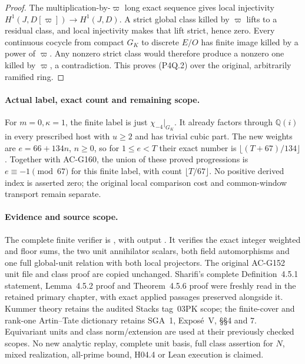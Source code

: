 \begin{proof}
The multiplication-by-$\varpi$ long exact sequence gives
local injectivity $H^1(J,D[\varpi])\to H^1(J,D)$.
A strict global class killed by $\varpi$ lifts to a residual
class, and local injectivity makes that lift strict, hence zero.
Every continuous cocycle from compact $G_K$ to discrete $E/O$
has finite image killed by a power of $\varpi$.
Any nonzero strict class would therefore produce a nonzero
one killed by $\varpi$, a contradiction.
This proves (P4Q.2) over the original, arbitrarily ramified ring.
\end{proof}

\paragraph{Actual label, exact count and remaining scope.}
For $m=0,\kappa=1$, the finite label is just $\chi_{-4}|_{G_K}$.
It already factors through $\mathbb Q(i)$ in every prescribed
host with $u\geq2$ and has trivial cubic part.
The new weights are $e=66+134n$, $n\geq0$, so for $1\leq e<T$
their exact number is $\lfloor(T+67)/134\rfloor$.
Together with AC-G160, the union of these proved progressions is
$e\equiv-1\pmod{67}$ for this finite label, with count
$\lfloor T/67\rfloor$.
No positive derived index is asserted zero; the original local
comparison cost and common-window transport remain separate.

\paragraph{Evidence and source scope.}
The complete finite verifier is
, with output
.
It verifies the exact integer weighted and floor sums, the two
unit annihilator scalars, both field automorphisms and one full
global-unit relation with both local projectors.
The original AC-G152 unit file and class proof are copied unchanged.
Sharifi's complete Definition~4.5.1 statement, Lemma~4.5.2 proof
and Theorem~4.5.6 proof were freshly read in the retained primary
chapter, with exact applied passages preserved alongside it.
Kummer theory retains the audited Stacks tag~03PK scope; the
finite-cover and rank-one Artin--Tate dictionary retains SGA~1,
Expos\'e~V, \S\S4 and 7.  Equivariant units and class norm/extension
are used at their previously checked scopes.
No new analytic replay, complete unit basis, full class assertion
for $N$, mixed realization, all-prime bound, H04.4 or Lean execution
is claimed.
